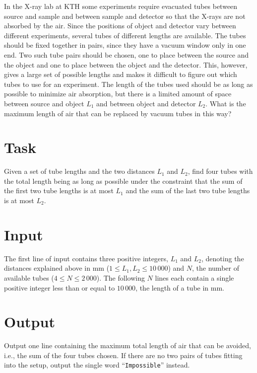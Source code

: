 
In the X-ray lab at KTH some experiments require evacuated tubes between source and sample and
between sample and detector so that the X-rays are not absorbed by the air. Since the positions of
object and detector vary between different experiments, several tubes of different lengths are available.
The tubes should be fixed together in pairs, since they have a vacuum window only in one end.  Two such tube pairs should be chosen, one to place between the source and the object and one to place between the object and the detector. This,
however, gives a large set of possible lengths and makes it difficult to figure out which tubes to
use for an experiment. The length of the tubes used should be as long as possible to minimize air
absorption, but there is a limited amount of space between source and object $L_1$ and between
object and detector $L_2$. What is the maximum length of air that can be replaced by vacuum tubes
in this way?

\section*{Task}
Given a set of tube lengths and the two distances $L_1$ and $L_2$, find four tubes with the total
length being as long as possible under the constraint that the sum of the first two tube lengths is
at most $L_1$ and the sum of the last two tube lengths is at most $L_2$.

\section*{Input}
The first line of input contains three positive integers, $L_1$ and $L_2$, denoting the distances explained above in mm ($1 \leq L_1, L_2 \leq 10\,000$) and $N$, the number of available tubes ($4 \leq N \leq 2\,000$). The following $N$ lines each contain a single positive integer less than or equal to $10\,000$, the length of a tube in mm.

\section*{Output}
Output one line containing the maximum total length of air that can be avoided, i.e., the sum of the
four tubes chosen. If there are no two pairs of tubes fitting into the setup, output the single word
``\verb|Impossible|'' instead.
